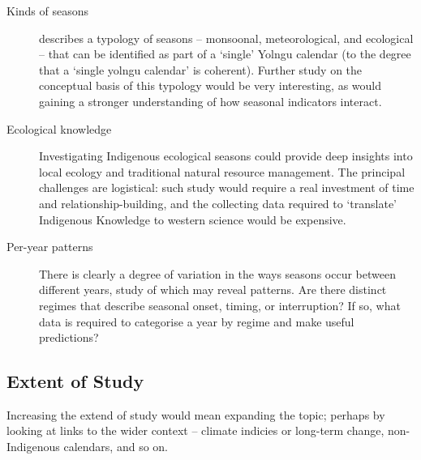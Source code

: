 \begin{description}
\item[Kinds of seasons]
     describes a typology of seasons -- monsoonal,
    meteorological, and ecological -- that can be identified as part of a
    `single' Yolngu calendar (to the degree that a `single yolngu calendar'
    is coherent).  Further study on the conceptual basis of this typology would
    be very interesting, as would gaining a stronger understanding of how
    seasonal indicators interact.

\item[Ecological knowledge]
    Investigating Indigenous ecological seasons could provide deep insights
    into local ecology and traditional natural resource management. The
    principal challenges are logistical:  such study would require a real
    investment of time and relationship-building, and the collecting data
    required to `translate' Indigenous Knowledge to western science would
    be expensive.

\item[Per-year patterns]
    There is clearly a degree of variation in the ways seasons occur between
    different years, study of which may reveal patterns.  Are there distinct
    regimes that describe seasonal onset, timing, or interruption?  If so, what
    data is required to categorise a year by regime and make useful predictions?
\end{description}

\subsection{Extent of Study}
Increasing the extend of study would mean expanding the topic; perhaps by
looking at links to the wider context -- climate indicies or long-term
change, non-Indigenous calendars, and so on.

